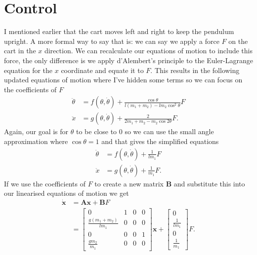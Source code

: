\documentclass{article}
\renewcommand{\vec}[1]{\boldsymbol{\mathbf{#1}}}
\newcommand{\dvec}[1]{\dot{\vec{#1}}}
\begin{document}
\section{Control}

I mentioned earlier that the cart moves left and right to keep the pendulum upright. A more formal way to say that is: we can say we apply a force $F$ on the cart in the $x$ direction. We can recalculate our equations of motion to include this force, the only difference is we apply d'Alembert's principle to the Euler-Lagrange equation for the $x$ coordinate and equate it to $F$. This results in the following updated equations of motion where I've hidden some terms so we can focus on the coefficients of $F$ \begin{align*}
  \ddot{\theta} & = f(\theta, \dot{\theta}) + \frac{\cos \theta}{l (m_1 + m_2) - l m_2 \cos^2 \theta} F \\
  \ddot{x}      & = g(\theta, \dot{\theta}) + \frac{2}{2 m_1 + m_2 - m_2 \cos 2 \theta} F.
\end{align*} Again, our goal is for $\theta$ to be close to $0$ so we can use the small angle approximation where $\cos \theta = 1$ and that gives the simplified equations \begin{align*}
  \ddot{\theta} & = f(\theta, \dot{\theta}) + \frac{1}{l m_1} F \\
  \ddot{x}      & = g(\theta, \dot{\theta}) + \frac{1}{m_1} F.
\end{align*} If we use the coefficients of $F$ to create a new matrix $\vec{B}$ and substitute this into our linearised equations of motion we get \begin{align*}
  \dvec{x} & = \vec{A} \vec{x} + \vec{B} F              \\
           & = \begin{bmatrix}
                 0                           & 1 & 0 & 0 \\
                 \frac{g (m_1 + m_2)}{l m_1} & 0 & 0 & 0 \\
                 0                           & 0 & 0 & 1 \\
                 \frac{g m_2}{m_1}           & 0 & 0 & 0
               \end{bmatrix} \vec{x} + \begin{bmatrix}
                                         0               \\
                                         \frac{1}{l m_1} \\
                                         0               \\
                                         \frac{1}{m_1}
                                       \end{bmatrix} F.
\end{align*}
\end{document}
